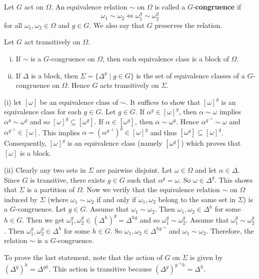 \begin{definition}
	Let $G$ act on $\Omega$. An equivalence relation $\sim$ on $\Omega$ is called a $G$-\textbf{congruence} if  $$\omega_1 \sim \omega_2 \iff \omega_1^g \sim \omega_2^g$$ 
	for all $\omega_1,\omega_2\in \Omega$ and $g\in G$. We also say that $G$ preserves the relation.
\end{definition}
\begin{proposition}
	Let $G$ act transitively on $\Omega$.
	\begin{enumerate}[(i)]
		\item If $\sim$ is a $G$-congruence on $\Omega$, then each equivalence class is a block of $\Omega$.
		\item  If  $\Delta$ is a block, then $\Sigma = \{\Delta^g\mid g\in G\}$ is the set of equivalence classes of a $G$-congruence on $\Omega$. Hence $G$ acts transitively on $\Sigma$.
	\end{enumerate}
\end{proposition}
\begin{sketch}
	(i) let $[\omega]$ be an equivalence class of $\sim$. It suffices to show that $[\omega]^g$ is an equivalence class for each $g\in G$. Let $g\in G$. If $\alpha^g\in [\omega]^g$, then $\alpha \sim \omega$ implies $\alpha^g \sim \omega^g$ and so $[\omega]^g\subseteq [\omega^g]$. If $\alpha\in [\omega^g]$, then $\alpha \sim \omega^g$. Hence $\alpha^{g^{-1}} \sim \omega$ and $\alpha^{g^{-1}}\in [\omega]$. This implies $\alpha = (\alpha^{g^{-1}})^g \in [\omega]^g$ and thus $[\omega^g]\subseteq [\omega]^g$. Consequently, $[\omega]^g$ is an equivalence class (namely $[\omega^g]$) which proves that $[\omega]$ is a block. 
	
(ii) Clearly any two sets in $\Sigma$ are pairwise disjoint. Let $\omega\in\Omega$ and let $\alpha\in \Delta$. Since $G$ is transitive, there exists $g \in G$ such that $\alpha^g = \omega$. So $\omega\in \Delta^g$. This shows that $\Sigma$ is a partition of $\Omega$. Now we verify that the equivalence relation $\sim$ on $\Omega$ induced by $\Sigma$ (where $\omega_1\sim\omega_2$ if and only if $\omega_1,\omega_2$ belong to the same set in $\Sigma$) is a $G$-congruence. Let $g\in G$. Assume  that $\omega_1 \sim \omega_2$. Then   $\omega_1, \omega_2 \in \Delta^h$ for some $h \in G$.  Then we get $\omega_1^g,\omega_2^g \in (\Delta^h)^g = \Delta^{hg}$ and so $\omega_1^g\sim\omega_2^g$.
 Assume that $\omega_1^g \sim \omega_2^g$. Then $\omega_1^g, \omega_2^g \in \Delta^{h}$ for some $h\in G$. So $\omega_1,\omega_2\in \Delta^{hg^{-1}}$ and $\omega_1\sim\omega_2$.  Therefore, the relation $\sim$ is a $G$-congruence.

To prove the last statement, note that the action of $G$ on $\Sigma$ is given by $(\Delta^g)^h = \Delta^{gh}$. This action is transitive because $(\Delta^g)^{g^{-1}h} = \Delta^h$. 
\end{sketch}

